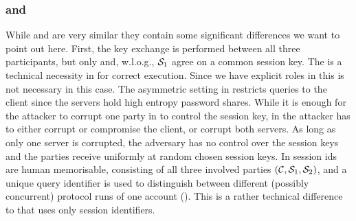 \subsubsection{\FTWOPAKE and \FPAKE}
While \FPAKE and \FTWOPAKE are very similar they contain some significant differences we want to point out here.
First, the key exchange is performed between all three participants, but only \Client and, w.l.o.g., $\mathcal{S}_1$ agree on a common session key.
The \role is a technical necessity in \FPAKE for correct execution.
Since we have explicit roles in \FTWOPAKE this is not necessary in this case.
The asymmetric setting in \FTWOPAKE restricts \TestPwd queries to the client since the servers hold high entropy password shares.
While it is enough for the attacker to corrupt one party in \FPAKE to control the session key, in \FTWOPAKE the attacker has to either corrupt or compromise the client, or corrupt both servers.
As long as only one server is corrupted, the adversary has no control over the session 	keys and the parties receive uniformly at random chosen session keys.
In \FTWOPAKE session ids are human memorisable, consisting of all three involved parties $(\mathcal{C}, \mathcal{S}_1, \mathcal{S}_2)$, and a unique query identifier is used to distinguish between different (possibly concurrent) protocol runs of one account (\sid).
This is a rather technical difference to \FPAKE that uses only session identifiers.

	


